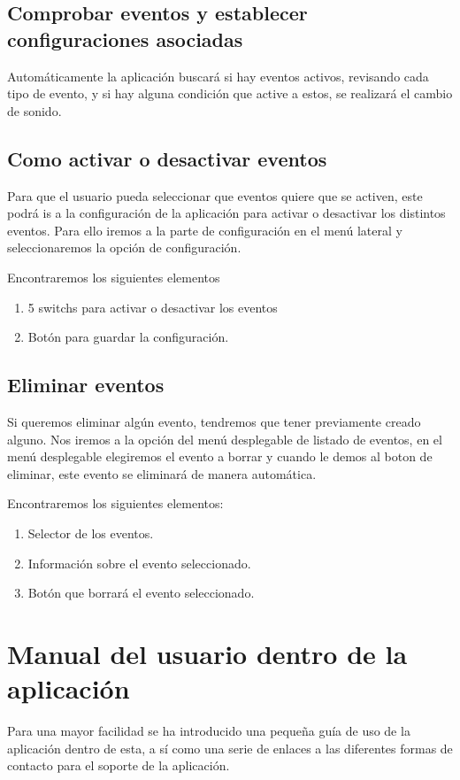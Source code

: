 \subsection{Comprobar eventos y establecer configuraciones asociadas}

Automáticamente la aplicación buscará si hay eventos activos, revisando cada tipo de evento, y si hay alguna condición que active a estos, se realizará el cambio de sonido.


\subsection{Como activar o desactivar eventos}
Para que el usuario pueda seleccionar que eventos quiere que se activen, este podrá is a la configuración de la aplicación para activar o desactivar los distintos eventos.
Para ello iremos a la parte de configuración en el menú lateral y seleccionaremos la opción de configuración.

Encontraremos los siguientes elementos
\begin{enumerate}
\item 5 switchs para activar o desactivar los eventos
\item Botón para guardar la configuración.
\end{enumerate}

\subsection{Eliminar eventos}
Si queremos eliminar algún evento, tendremos que tener previamente creado alguno. Nos iremos a la opción del menú desplegable de listado de eventos, en el menú desplegable elegiremos el evento a borrar y cuando le demos al boton de eliminar, este evento se eliminará de manera automática.

Encontraremos los siguientes elementos:
\begin{enumerate}
\item Selector de los eventos.
\item Información sobre el evento seleccionado.
\item Botón que borrará el evento seleccionado.
\end{enumerate}

\section{Manual del usuario dentro de la aplicación}
Para una mayor facilidad se ha introducido una pequeña guía de uso de la aplicación dentro de esta, a sí como una serie de enlaces a las diferentes formas de contacto para el soporte de la aplicación.

